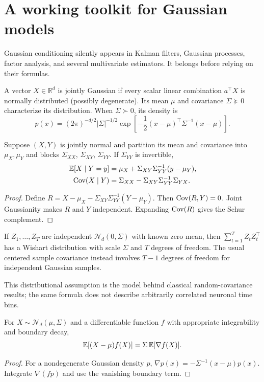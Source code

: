 \chapter{A working toolkit for Gaussian models}
\label{ch:gaussian-toolkit}
Gaussian conditioning silently appears in Kalman filters, Gaussian
processes, factor analysis, and several multivariate estimators.
It belongs before relying on their formulas.

\begin{definition}
A vector $X\in\mathbb R^d$ is jointly Gaussian if every scalar
linear combination $a^\top X$ is normally distributed (possibly
degenerate). Its mean $\mu$ and covariance $\Sigma\succeq0$
characterize its distribution. When $\Sigma\succ0$, its density is
\[
 p(x)=(2\pi)^{-d/2}|\Sigma|^{-1/2}
 \exp\!\left[-\frac12(x-\mu)^\top\Sigma^{-1}(x-\mu)\right].
\]
\end{definition}
\begin{theorem}
Suppose $(X,Y)$ is jointly normal and partition its mean and
covariance into $\mu_X,\mu_Y$ and blocks $\Sigma_{XX}$,
$\Sigma_{XY}$, $\Sigma_{YY}$. If $\Sigma_{YY}$ is invertible,
\[
\begin{aligned}
\mathbb{E}[X\mid Y=y]&=\mu_X+\Sigma_{XY}\Sigma_{YY}^{-1}(y-\mu_Y),\\
\operatorname{Cov}(X\mid Y)&=\Sigma_{XX}
 -\Sigma_{XY}\Sigma_{YY}^{-1}\Sigma_{YX}.
\end{aligned}
\]
\end{theorem}
\begin{proof}
Define $R=X-\mu_X-\Sigma_{XY}\Sigma_{YY}^{-1}(Y-\mu_Y)$.
Then $\operatorname{Cov}(R,Y)=0$. Joint Gaussianity makes $R$ and $Y$
independent. Expanding $\operatorname{Cov}(R)$ gives the Schur complement.
\end{proof}

\begin{proposition}
If $Z_1,\ldots,Z_T$ are independent $\mathcal N_d(0,\Sigma)$
with known zero mean, then $\sum_{t=1}^T Z_tZ_t^\top$
has a Wishart distribution with scale $\Sigma$ and $T$
degrees of freedom. The usual centered sample covariance instead
involves $T-1$ degrees of freedom for independent Gaussian samples.
\end{proposition}
This distributional assumption is the model behind classical
random-covariance results; the same formula does not describe
arbitrarily correlated neuronal time bins.

\begin{proposition}
For $X\sim\mathcal N_d(\mu,\Sigma)$ and a differentiable
function $f$ with appropriate integrability and boundary decay,
\[
\mathbb{E}[(X-\mu)f(X)]=\Sigma\,\mathbb{E}[\nabla f(X)].
\]
\end{proposition}
\begin{proof}
For a nondegenerate Gaussian density $p$,
$\nabla p(x)=-\Sigma^{-1}(x-\mu)p(x)$.
Integrate $\nabla(fp)$ and use the vanishing boundary term.
\end{proof}


